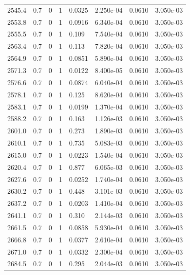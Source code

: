 \documentclass[preview]{standalone}
\begin{document}
{{{{{{{{{{{\begin{tabular}{L{1.2cm}C{1.2cm} C{0.3cm}C{0.5cm} C{1.4cm}C{1.4cm} C{1.4cm}C{1.4cm}}
  2545.4  &   0.7  & 0     &  1 &  0.0325  & 2.250e-04  & 0.0610 &  3.050e-03   \\ 
  2553.8  &   0.7  & 0     &  1 &  0.0916  & 6.340e-04  & 0.0610 &  3.050e-03   \\ 
  2555.5  &   0.7  & 0     &  1 &  0.109  & 7.540e-04  & 0.0610 &  3.050e-03   \\ 
  2563.4  &   0.7  & 0     &  1 &  0.113  & 7.820e-04  & 0.0610 &  3.050e-03   \\ 
  2564.9  &   0.7  & 0     &  1 &  0.0851  & 5.890e-04  & 0.0610 &  3.050e-03   \\ 
  2571.3  &   0.7  & 0     &  1 &  0.0122  & 8.400e-05  & 0.0610 &  3.050e-03   \\ 
  2576.6  &   0.7  & 0     &  1 &  0.0874  & 6.040e-04  & 0.0610 &  3.050e-03   \\ 
  2578.1  &   0.7  & 0     &  1 &  0.125  & 8.620e-04  & 0.0610 &  3.050e-03   \\ 
  2583.1  &   0.7  & 0     &  1 &  0.0199  & 1.370e-04  & 0.0610 &  3.050e-03   \\ 
  2588.2  &   0.7  & 0     &  1 &  0.163  & 1.126e-03  & 0.0610 &  3.050e-03   \\ 
  2601.0  &   0.7  & 0     &  1 &  0.273  & 1.890e-03  & 0.0610 &  3.050e-03   \\ 
  2610.1  &   0.7  & 0     &  1 &  0.735  & 5.083e-03  & 0.0610 &  3.050e-03   \\ 
  2615.0  &   0.7  & 0     &  1 &  0.0223  & 1.540e-04  & 0.0610 &  3.050e-03   \\ 
  2620.4  &   0.7  & 0     &  1 &  0.877  & 6.065e-03  & 0.0610 &  3.050e-03   \\ 
  2627.6  &   0.7  & 0     &  1 &  0.0252  & 1.740e-04  & 0.0610 &  3.050e-03   \\ 
  2630.2  &   0.7  & 0     &  1 &  0.448  & 3.101e-03  & 0.0610 &  3.050e-03   \\ 
  2637.2  &   0.7  & 0     &  1 &  0.0203  & 1.410e-04  & 0.0610 &  3.050e-03   \\ 
  2641.1  &   0.7  & 0     &  1 &  0.310  & 2.144e-03  & 0.0610 &  3.050e-03   \\ 
  2661.5  &   0.7  & 0     &  1 &  0.0858  & 5.930e-04  & 0.0610 &  3.050e-03   \\ 
  2666.8  &   0.7  & 0     &  1 &  0.0377  & 2.610e-04  & 0.0610 &  3.050e-03   \\ 
  2671.0  &   0.7  & 0     &  1 &  0.0332  & 2.300e-04  & 0.0610 &  3.050e-03   \\ 
  2684.5  &   0.7  & 0     &  1 &  0.295  & 2.044e-03  & 0.0610 &  3.050e-03   \\ 

\end{tabular}}}}}}}}}}}}
\end{document}
